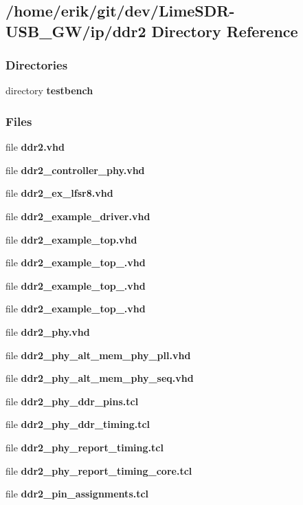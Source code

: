 \subsection{/home/erik/git/dev/\+Lime\+S\+D\+R-\/\+U\+S\+B\+\_\+\+G\+W/ip/ddr2 Directory Reference}
\label{dir_9e81a21cedc4cd4c772b770b41a65d83}
\subsubsection*{Directories}
\begin{DoxyCompactItemize}
\item 
directory {\bf testbench}
\end{DoxyCompactItemize}
\subsubsection*{Files}
\begin{DoxyCompactItemize}
\item 
file {\bf ddr2.\+vhd}
\item 
file {\bf ddr2\+\_\+controller\+\_\+phy.\+vhd}
\item 
file {\bf ddr2\+\_\+ex\+\_\+lfsr8.\+vhd}
\item 
file {\bf ddr2\+\_\+example\+\_\+driver.\+vhd}
\item 
file {\bf ddr2\+\_\+example\+\_\+top.\+vhd}
\item 
file {\bf ddr2\+\_\+example\+\_\+top\+\_.\+vhd}
\item 
file {\bf ddr2\+\_\+example\+\_\+top\+\_.\+vhd}
\item 
file {\bf ddr2\+\_\+example\+\_\+top\+\_.\+vhd}
\item 
file {\bf ddr2\+\_\+phy.\+vhd}
\item 
file {\bf ddr2\+\_\+phy\+\_\+alt\+\_\+mem\+\_\+phy\+\_\+pll.\+vhd}
\item 
file {\bf ddr2\+\_\+phy\+\_\+alt\+\_\+mem\+\_\+phy\+\_\+seq.\+vhd}
\item 
file {\bf ddr2\+\_\+phy\+\_\+ddr\+\_\+pins.\+tcl}
\item 
file {\bf ddr2\+\_\+phy\+\_\+ddr\+\_\+timing.\+tcl}
\item 
file {\bf ddr2\+\_\+phy\+\_\+report\+\_\+timing.\+tcl}
\item 
file {\bf ddr2\+\_\+phy\+\_\+report\+\_\+timing\+\_\+core.\+tcl}
\item 
file {\bf ddr2\+\_\+pin\+\_\+assignments.\+tcl}
\end{DoxyCompactItemize}
